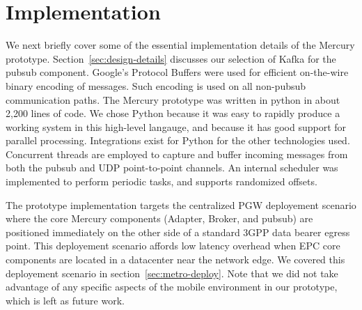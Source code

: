 \section{Implementation}

We next briefly cover some of the essential implementation details of
the Mercury prototype. Section~\ref{sec:design-details} discusses our
selection of Kafka for the pubsub component. Google's Protocol Buffers
were used for efficient on-the-wire binary encoding of messages. Such
encoding is used on all non-pubsub communication paths. The Mercury
prototype was written in python in about 2,200 lines of code. We chose
Python because it was easy to rapidly produce a working system in this
high-level langauge, and because it has good support for parallel
processing. Integrations exist for Python for the other technologies
used. Concurrent threads are employed to capture and buffer incoming
messages from both the pubsub and UDP point-to-point channels. An
internal scheduler was implemented to perform periodic tasks, and
supports randomized offsets.

The prototype implementation targets the centralized PGW deployement
scenario where the core Mercury components (Adapter, Broker, and
pubsub) are positioned immediately on the other side of a standard
3GPP data bearer egress point. This deployement scenario affords low
latency overhead when EPC core components are located in a datacenter
near the network edge.  We covered this deployement scenario in
section~\ref{sec:metro-deploy}.  Note that we did not take advantage
of any specific aspects of the mobile environment in our prototype,
which is left as future work.
